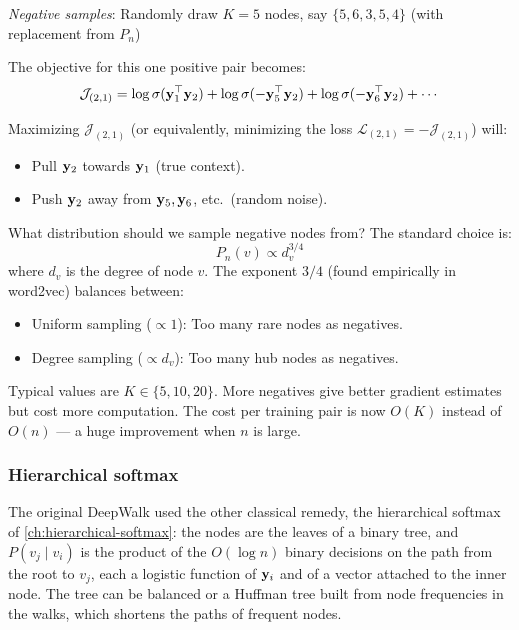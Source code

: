 \begin{notechapter}
\begin{example}
\emph{Negative samples}: Randomly draw $K=5$ nodes, say $\{5, 6, 3, 5, 4\}$ (with replacement from $P_n$)

The objective for this one positive pair becomes:
\[
\mathcal{J}_{(2,1)} = \log \sigma(\mathbf{y}_1^\top \mathbf{y}_2) + \log \sigma(-\mathbf{y}_5^\top \mathbf{y}_2) + \log \sigma(-\mathbf{y}_6^\top \mathbf{y}_2) + \cdots
\]

Maximizing $\mathcal{J}_{(2,1)}$ (or equivalently, minimizing the loss $\mathcal{L}_{(2,1)} = -\mathcal{J}_{(2,1)}$) will:
\begin{itemize}
    \item Pull $\mathbf{y}_2$ towards $\mathbf{y}_1$ (true context).
    \item Push $\mathbf{y}_2$ away from $\mathbf{y}_5, \mathbf{y}_6$, etc.\ (random noise).
\end{itemize}
\end{example}

\begin{remark}
What distribution should we sample negative nodes from? The standard choice is:
\[
P_n(v) \propto d_v^{3/4}
\]
where $d_v$ is the degree of node $v$. The exponent $3/4$ (found empirically in word2vec) balances between:
\begin{itemize}
    \item Uniform sampling ($\propto 1$): Too many rare nodes as negatives.
    \item Degree sampling ($\propto d_v$): Too many hub nodes as negatives.
\end{itemize}
\end{remark}

\begin{remark}
Typical values are $K \in \{5, 10, 20\}$. More negatives give better gradient estimates but cost more computation. The cost per training pair is now $O(K)$ instead of $O(n)$ --- a huge improvement when $n$ is large.
\end{remark}

\subsubsection*{Hierarchical softmax}

The original DeepWalk used the other classical remedy, the hierarchical softmax of \cref{ch:hierarchical-softmax}: the nodes are the leaves of a binary tree, and $P(v_j \mid v_i)$ is the product of the $O(\log n)$ binary decisions on the path from the root to $v_j$, each a logistic function of $\mathbf{y}_i$ and of a vector attached to the inner node. The tree can be balanced or a Huffman tree built from node frequencies in the walks, which shortens the paths of frequent nodes.


\end{notechapter}
